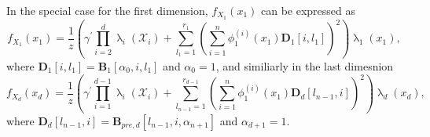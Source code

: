 In the special case for the first dimension, $f_{X_1}(x_1)$ can be expressed as
\begin{equation}
	f_{X_1}(x_1) = \frac{1}{z} \left(\gamma^{\prime} \prod_{i=2}^{d} \uplambda_i(\mathcal{X}_i) + \sum_{l_1=1}^{r_1} \left(\sum_{i=1}^{n} \phi^{(i)}_1(x_1) \bm{D}_1[i, l_1] \right)^2 \right) \uplambda_1(x_1),
\end{equation}
where $\bm{D}_1[i, l_1] = \bm{B}_1[\alpha_0, i, l_1]$ and $\alpha_0 = 1$,
and similiarly in the last dimesnion
\begin{equation}
	f_{X_d}(x_d) = \frac{1}{z} \left(\gamma^{\prime} \prod_{i=1}^{d-1} \uplambda_i(\mathcal{X}_i) + \sum_{l_{n-1}=1}^{r_{d-1}} \left(\sum_{i=1}^{n} \phi^{(i)}_1(x_1) \bm{D}_d[l_{n-1},i] \right)^2 \right) \uplambda_d(x_d),
\end{equation}
where $\bm{D}_d[l_{n-1},i] = \bm{B}_{pre,d}[l_{n-1}, i, \alpha_{n+1}]$ and $\alpha_{d+1} = 1$.


